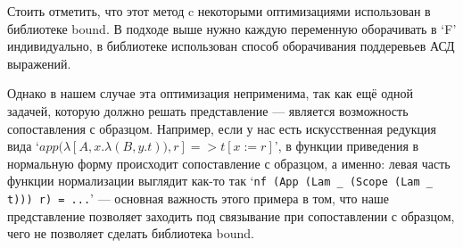 \hfill

Стоить отметить, что этот метод c некоторыми оптимизациями использован в библиотеке bound\cite{bound}. В подходе выше нужно каждую переменную оборачивать в `F' индивидуально, в библиотеке использован способ оборачивания поддеревьев АСД выражений.

Однако в нашем случае эта оптимизация неприменима, так как ещё одной задачей, которую должно решать представление --- является возможность сопоставления с образцом. Например, если у нас есть искусственная редукция вида `$app(\lambda[A, x.\lambda(B, y.t)), r] => t[x:=r]$', в функции приведения в нормальную форму происходит сопоставление с образцом, а именно: левая часть функции нормализации выглядит как-то так `\lstinline{nf (App (Lam _ (Scope (Lam _ t))) r) = ...}' --- основная важность этого примера в том, что наше представление позволяет заходить под связывание при сопоставлении с образцом, чего не позволяет сделать библиотека bound.
